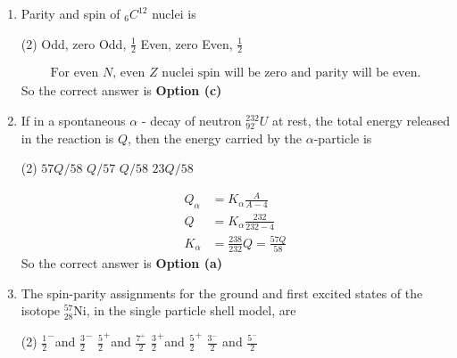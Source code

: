 \begin{enumerate}
\begin{tasks}
		\task[\textbf{c.}]Is always zero
		\task[\textbf{d.}]Increases with $Z$ and $A$
	\end{tasks}
\begin{answer}
	So the correct answer is \textbf{Option (c)}
\end{answer}
	\item  Parity and spin of ${ }_6 C^{12}$ nuclei is
	 \begin{tasks}(2)
		\task[\textbf{a.}]Odd, zero
		\task[\textbf{b.}]Odd, $\frac{1}{2}$
		\task[\textbf{c.}]Even, zero
		\task[\textbf{d.}]Even, $\frac{1}{2}$ 
	\end{tasks}
\begin{answer}
	$$
	\begin{aligned}
\text { For even } N \text {, even } Z \text { nuclei spin will be zero and parity will be even. }
	\end{aligned}
	$$
	So the correct answer is \textbf{Option (c)}
\end{answer}
	\item  If in a spontaneous $\alpha$ - decay of neutron ${ }_{92}^{232} U$ at rest, the total energy released in the reaction is $Q$, then the energy carried by the $\alpha$-particle is
	 \begin{tasks}(2)
		\task[\textbf{a.}] $57 Q / 58$
		\task[\textbf{b.}]$Q / 57$
		\task[\textbf{c.}]$Q / 58$
		\task[\textbf{d.}]$23 Q / 58$ 
	\end{tasks}
\begin{answer}
	$$
	\begin{aligned}
	Q_\alpha&=K_\alpha \frac{A}{A-4}\\
	Q&=K_\alpha \frac{232}{232-4} \\
	K_\alpha&=\frac{238}{232} Q=\frac{57 Q}{58}
\end{aligned}
$$
So the correct answer is \textbf{Option (a)}
\end{answer}
	\item  The spin-parity assignments for the ground and first excited states of the isotope ${ }_{28}^{57} \mathrm{Ni}$, in the single particle shell model, are
	 \begin{tasks}(2)
		\task[\textbf{a.}]$\frac{1}{2}^{-}$and $\frac{3}{2}^{-}$
		\task[\textbf{b.}]$\frac{5}{2}^{+}$and $\frac{7^{+}}{2}$
		\task[\textbf{c.}]$\frac{3}{2}^{+}$and $\frac{5}{2}^{+}$
		\task[\textbf{d.}]$\frac{3^{-}}{2}$ and $\frac{5^{-}}{2}$
	\end{tasks}
\begin{answer}
	$$
	\begin{aligned}

\end{aligned}$$
\end{answer}
\end{enumerate}
